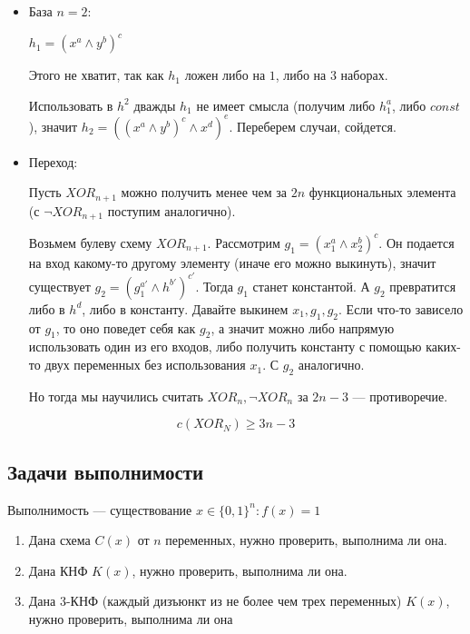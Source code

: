 \begin{itemize}
    \item
        База \( n = 2 \):

        \( h_1 = (x^a \land y^b)^c \)

        Этого не хватит, так как \( h_1 \) ложен либо на \( 1 \), либо на \( 3 \) наборах.

        Использовать в \( h^2 \) дважды \( h_1 \) не имеет смысла (получим либо \( h_1^a \), либо \( const \)),
        значит \( h_2 = ((x^a \land y^b)^c \land x^d)^e \).
        Переберем случаи, сойдется.
    \item
        Переход:

        Пусть \( XOR_{n + 1} \) можно получить менее чем за \( 2n \) функциональных элемента
        (с \( \lnot XOR_{n + 1} \) поступим аналогично).

        Возьмем булеву схему \( XOR_{n + 1} \).
        Рассмотрим \( g_1 = (x_1^a \land x_2^b)^c \).
        Он подается на вход какому-то другому элементу (иначе его можно выкинуть),
        значит существует \( g_2 = (g_1^{a'} \land h^{b'})^{c'} \).
        Тогда \( g_1 \) станет константой.
        А \( g_2 \) превратится либо в \( h^d \), либо в константу.
        Давайте выкинем \( x_1, g_1, g_2 \).
        Если что-то зависело от \( g_1 \), то оно поведет себя как \( g_2 \),
        а значит можно либо напрямую использовать один из его входов, либо получить константу с помощью
        каких-то двух переменных без использования \( x_1 \).
        С \( g_2 \) аналогично.

        Но тогда мы научились считать \( XOR_n, \lnot XOR_n \) за \( 2n - 3 \) --- противоречие.
\end{itemize}

\begin{exercise}{}{}
    \[
        c(XOR_N) \geq 3n - 3
    \]
\end{exercise}

\subsection{Задачи выполнимости}

Выполнимость --- существование \( x \in \{ 0, 1 \}^n : f(x) = 1 \)

\begin{enumerate}
    \item
        Дана схема \( C(x) \) от  \( n \) переменных, нужно проверить, выполнима ли она.
    \item
        Дана КНФ \( K(x) \), нужно проверить, выполнима ли она.
    \item
        Дана 3-КНФ (каждый дизъюнкт из не более чем трех переменных) \( K(x) \), нужно проверить, выполнима ли она 
\end{enumerate}


